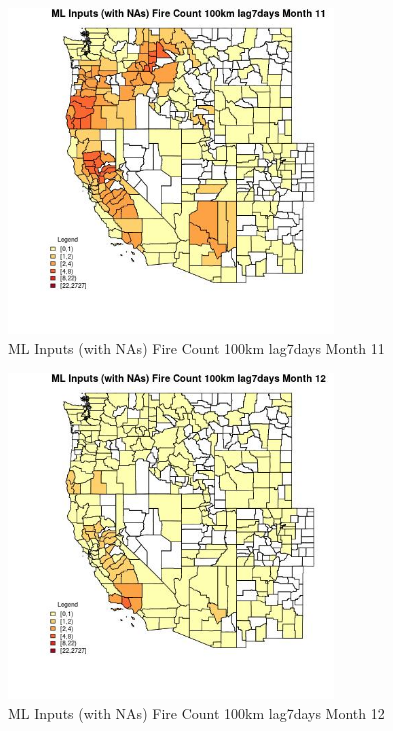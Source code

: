 \clearpage 

\begin{figure} 
\centering  
\includegraphics[width=0.77\textwidth]{Code_Outputs/Report_ML_input_PM25_Step4_part_f_de_duplicated_aves_prioritize_24hr_obswNAs_CountyFire_Count_100km_lag7daysmedianMonth11.jpg} 
\caption{\label{fig:Report_ML_input_PM25_Step4_part_f_de_duplicated_aves_prioritize_24hr_obswNAsCountyFire_Count_100km_lag7daysmedianMonth11}ML Inputs (with NAs) Fire Count 100km lag7days Month 11} 
\end{figure} 
 

\begin{figure} 
\centering  
\includegraphics[width=0.77\textwidth]{Code_Outputs/Report_ML_input_PM25_Step4_part_f_de_duplicated_aves_prioritize_24hr_obswNAs_CountyFire_Count_100km_lag7daysmedianMonth12.jpg} 
\caption{\label{fig:Report_ML_input_PM25_Step4_part_f_de_duplicated_aves_prioritize_24hr_obswNAsCountyFire_Count_100km_lag7daysmedianMonth12}ML Inputs (with NAs) Fire Count 100km lag7days Month 12} 
\end{figure} 
 

